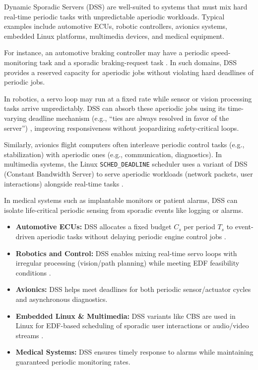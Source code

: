 \documentclass[conference]{IEEEtran}
\begin{document}
Dynamic Sporadic Servers (DSS) are well-suited to systems that must mix hard real-time periodic tasks with unpredictable aperiodic workloads. Typical examples include automotive ECUs, robotic controllers, avionics systems, embedded Linux platforms, multimedia devices, and medical equipment.

For instance, an automotive braking controller may have a periodic speed-monitoring task and a sporadic braking-request task \cite{diva2020ecu}. In such domains, DSS provides a reserved capacity for aperiodic jobs without violating hard deadlines of periodic jobs.

In robotics, a servo loop may run at a fixed rate while sensor or vision processing tasks arrive unpredictably. DSS can absorb these aperiodic jobs using its time-varying deadline mechanism (e.g., “ties are always resolved in favor of the server”) \cite{cpen432}, improving responsiveness without jeopardizing safety-critical loops.

Similarly, avionics flight computers often interleave periodic control tasks (e.g., stabilization) with aperiodic ones (e.g., communication, diagnostics). In multimedia systems, the Linux \texttt{SCHED\_DEADLINE} scheduler uses a variant of DSS (Constant Bandwidth Server) to serve aperiodic workloads (network packets, user interactions) alongside real-time tasks \cite{cpen432}.

In medical systems such as implantable monitors or patient alarms, DSS can isolate life-critical periodic sensing from sporadic events like logging or alarms.

\begin{itemize}
    \item \textbf{Automotive ECUs:} DSS allocates a fixed budget $C_s$ per period $T_s$ to event-driven aperiodic tasks without delaying periodic engine control jobs \cite{diva2020ecu}.
    \item \textbf{Robotics and Control:} DSS enables mixing real-time servo loops with irregular processing (vision/path planning) while meeting EDF feasibility conditions \cite{cpen432}.
    \item \textbf{Avionics:} DSS helps meet deadlines for both periodic sensor/actuator cycles and asynchronous diagnostics.
    \item \textbf{Embedded Linux \& Multimedia:} DSS variants like CBS are used in Linux for EDF-based scheduling of sporadic user interactions or audio/video streams \cite{cpen432}.
    \item \textbf{Medical Systems:} DSS ensures timely response to alarms while maintaining guaranteed periodic monitoring rates.
\end{itemize}
\end{document}
